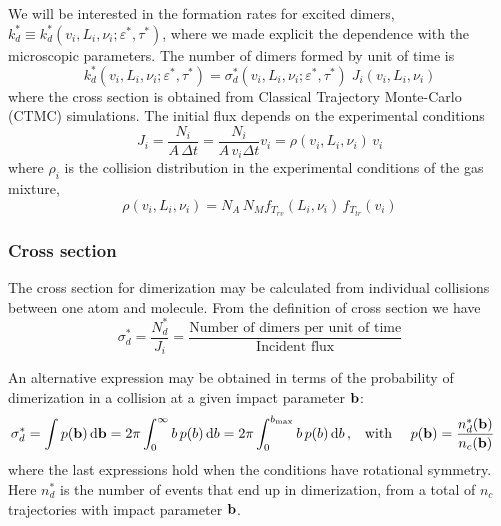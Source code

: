 We will be interested in the formation rates for excited dimers, $k_{d}^{*} \equiv k_{d}^{*}(v_{i}, L_{i}, \nu_{i} ; \varepsilon^{*}, \tau^{*})$, where we made explicit the dependence with the microscopic parameters. The number of dimers formed by unit of time is
\begin{equation}
  \label{Q:def-dimer-rate}
  k_{d}^{*}(v_{i}, L_{i}, \nu_{i} ; \varepsilon^{*}, \tau^{*}) = \sigma_{d}^{*}(v_{i}, L_{i}, \nu_{i} ; \varepsilon^{*}, \tau^{*}) \; J_{i}(v_{i}, L_{i}, \nu_{i} )
\end{equation}
where the cross section is obtained from Classical Trajectory Monte-Carlo (CTMC) simulations. The initial flux depends on the experimental conditions
\begin{equation}
  \label{Q:rates-flux}
  J_{i} =\frac{N_{i}}{A \,\Delta t} = \frac{N_{i}}{A \, v_{i} \Delta t} v_{i} = \rho(v_{i}, L_{i}, \nu_{i})\, v_{i}
\end{equation}
%
where $\rho_{i}$ is the collision distribution in the experimental conditions of the gas mixture,
\begin{equation}
  \label{Q:rates-def-collis-distrib}
  \rho(v_{i}, L_{i}, \nu_{i}) = N_{A} \, N_{M} f_{T_{rv}}(L_{i},\nu_{i}) \, f_{T_{tr}}(v_{i})
\end{equation}

\subsubsection{Cross section}
\label{S:cross-section}

The cross section for dimerization may be calculated from individual collisions between one atom and molecule. 
From the definition of cross section we have
\begin{equation*}
  \sigma_{d}^{*} = \frac{N_{d}^{*}}{J_{i}}= \frac{\text{Number of dimers per unit of time}}{\text{Incident flux}}
\end{equation*}

An alternative expression may be obtained in terms of the probability of dimerization in a collision at a given impact parameter $\mathbf{b}$:
\begin{align}
  \label{Q:rates-def-probab}
  \sigma_{d}^{*} = \int p(\mathbf{b}) \,\mathrm{d} \mathbf{b} = 2 \pi \int_{0}^{\infty} b \, p(b) \,\mathrm{d} b = 2 \pi \int_{0}^{b_{\text{max}}} b \, p(b) \,\mathrm{d} b\,, & \quad \text{with } \quad  p(\mathbf{b}) = \frac{n_{d}^{*}(\mathbf{b})}{n_{c}(\mathbf{b})}
\end{align}
where the last expressions hold when the conditions have rotational symmetry. Here $n_{d}^{*}$ is the number of events that end up in dimerization, from a total of $n_{c}$ trajectories with impact parameter $\mathbf{b}$.

